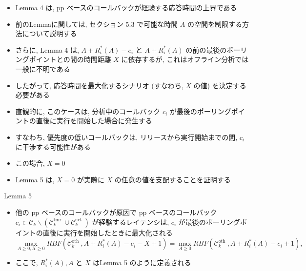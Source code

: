 \begin{frame}{}
    \begin{itemize}
        \item Lemma 4 は, pp ベースのコールバックが経験する応答時間の上界である
\item 前のLemmaに関しては, セクション 5.3 で可能な時間 $A$ の空間を制限する方法について説明する
\item さらに, Lemma 4 は, $A+R_{i}^{*}(A)-e_{i}$ と $A+R_{i}^{*}(A)$ の前の最後のポーリングポイントとの間の時間距離 $X$ に依存するが, これはオフライン分析では一般に不明である
\item したがって, 応答時間を最大化するシナリオ (すなわち,  $X$ の値) を決定する必要がある
\item 直観的に, このケースは, 分析中のコールバック $c_{i}$ が最後のポーリングポイントの直後に実行を開始した場合に発生する
\item すなわち, 優先度の低いコールバックは, リリースから実行開始までの間, $c_{i}$ に干渉する可能性がある
\item この場合, $X=0$
\item Lemma 5 は, $X=0$ が実際に $X$ の任意の値を支配することを証明する
    \end{itemize}
\end{frame}

\begin{frame}[label=lemma5]{Lemma 5}
    \begin{lemma}[]
        \begin{itemize}
            \item 他の pp ベースのコールバックが原因で pp ベースのコールバック $c_{i} \in \mathcal{C}_{k} \backslash\left(\mathcal{C}_{k}^{\text {tmr }} \cup \mathcal{C}_{k}^{\text {evt }}\right)$ が経験するレイテンシは, $c_{i}$ が最後のポーリングポイントの直後に実行を開始したときに最大化される
                  \begin{equation*}
                      \max _{A \geq 0, X \geq 0} R B F\left(\mathcal{C}_{k}^{\text {oth }}, A+R_{i}^{*}(A)-e_{i}-X+1\right)=\max _{A \geq 0} R B F\left(\mathcal{C}_{k}^{\text {oth }}, A+R_{i}^{*}(A)-e_{i}+1\right),
                  \end{equation*}

            \item ここで, $R_{i}^{*}(A), A$ と $X$ はLemma 5 のように定義される
        \end{itemize}
    \end{lemma}
\end{frame}

